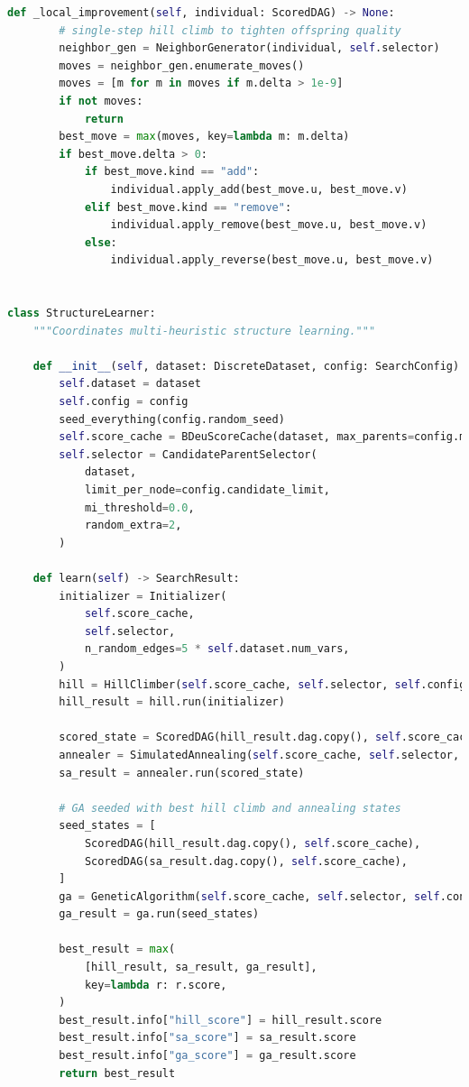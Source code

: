 \documentclass[twoside,11pt]{article}
\begin{document}
\begin{algorithm}
\begin{lstlisting}[language=Python]
    def _local_improvement(self, individual: ScoredDAG) -> None:
        # single-step hill climb to tighten offspring quality
        neighbor_gen = NeighborGenerator(individual, self.selector)
        moves = neighbor_gen.enumerate_moves()
        moves = [m for m in moves if m.delta > 1e-9]
        if not moves:
            return
        best_move = max(moves, key=lambda m: m.delta)
        if best_move.delta > 0:
            if best_move.kind == "add":
                individual.apply_add(best_move.u, best_move.v)
            elif best_move.kind == "remove":
                individual.apply_remove(best_move.u, best_move.v)
            else:
                individual.apply_reverse(best_move.u, best_move.v)


class StructureLearner:
    """Coordinates multi-heuristic structure learning."""

    def __init__(self, dataset: DiscreteDataset, config: SearchConfig):
        self.dataset = dataset
        self.config = config
        seed_everything(config.random_seed)
        self.score_cache = BDeuScoreCache(dataset, max_parents=config.max_parents)
        self.selector = CandidateParentSelector(
            dataset,
            limit_per_node=config.candidate_limit,
            mi_threshold=0.0,
            random_extra=2,
        )

    def learn(self) -> SearchResult:
        initializer = Initializer(
            self.score_cache,
            self.selector,
            n_random_edges=5 * self.dataset.num_vars,
        )
        hill = HillClimber(self.score_cache, self.selector, self.config)
        hill_result = hill.run(initializer)

        scored_state = ScoredDAG(hill_result.dag.copy(), self.score_cache)
        annealer = SimulatedAnnealing(self.score_cache, self.selector, self.config)
        sa_result = annealer.run(scored_state)

        # GA seeded with best hill climb and annealing states
        seed_states = [
            ScoredDAG(hill_result.dag.copy(), self.score_cache),
            ScoredDAG(sa_result.dag.copy(), self.score_cache),
        ]
        ga = GeneticAlgorithm(self.score_cache, self.selector, self.config)
        ga_result = ga.run(seed_states)

        best_result = max(
            [hill_result, sa_result, ga_result],
            key=lambda r: r.score,
        )
        best_result.info["hill_score"] = hill_result.score
        best_result.info["sa_score"] = sa_result.score
        best_result.info["ga_score"] = ga_result.score
        return best_result



\end{lstlisting}
\end{algorithm}
\end{document}
